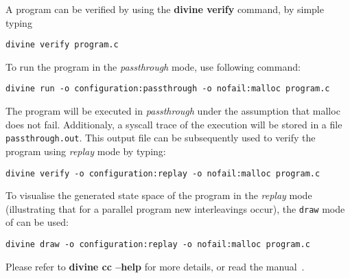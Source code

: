 A program can be verified by \divine using the \textbf{divine verify} command, by simple typing 
\begin{lstlisting}[style=DOS]
divine verify program.c
\end{lstlisting}

To run the program in the \textit{passthrough} mode, use following command:

\begin{lstlisting}[style=DOS]
divine run -o configuration:passthrough -o nofail:malloc program.c
\end{lstlisting}

The program will be executed in \textit{passthrough} under the assumption that malloc does not fail. Additionaly, a syscall trace of the execution will be stored in a file \texttt{passthrough.out}. This output file can be subsequently used to verify the program using \textit{replay} mode by typing:

\begin{lstlisting}[style=DOS]
divine verify -o configuration:replay -o nofail:malloc program.c
\end{lstlisting}

To visualise the generated state space of the program in the \textit{replay} mode (illustrating that for a parallel program new interleavings occur), the \texttt{draw} mode of \divine can be used:

\begin{lstlisting}[style=DOS]
divine draw -o configuration:replay -o nofail:malloc program.c
\end{lstlisting}

Please refer to \textbf{divine cc --help} for more details, or read the manual~\cite{Divine}.

